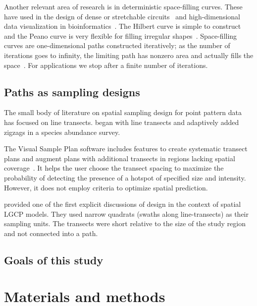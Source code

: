 \documentclass[review]{elsarticle}
\begin{document}
Another relevant area of research is in deterministic space-filling curves.
These have used in the design of dense or stretchable
circuits~\citep{ogorzalek,mazhang} and high-dimensional data visualization
in bioinformatics~\citep{hilbertvis}. The Hilbert curve is simple to construct
and the Peano curve is very flexible for filling irregular
shapes~\citep{fanetal}. Space-filling curves are one-dimensional paths
constructed iteratively; as the number of iterations goes to infinity, the
limiting path has nonzero area and actually fills the space~\citep{sagan}. For
applications we stop after a finite number of iterations.


\subsection{Paths as sampling designs}

The small body of literature on spatial sampling design for point pattern
data has focused on line transects. \citet{pollard} began with line transects
and adaptively added zigzags in a species abundance survey.

The Visual Sample Plan software includes features to create systematic transect
plans and augment plans with additional transects in regions lacking spatial
coverage~\citep{vspguide}. It helps the user choose the transect spacing to
maximize the probability of detecting the presence of a hotspot of specified
size and intensity. However, it does not employ criteria to optimize spatial
prediction.

\citet{liuvanhatalo} provided one of the first explicit discussions of design
in the context of spatial LGCP models. They used narrow quadrats (swaths along
line-transects) as their sampling units. The transects were short relative to
the size of the study region and not connected into a path.


\subsection{Goals of this study}






\section{Materials and methods}
\end{document}
